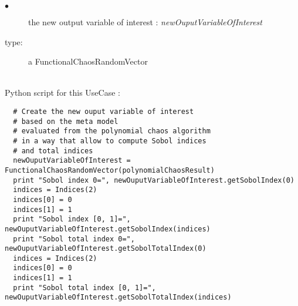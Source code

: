 {
  \begin{description}
  \item[$\bullet$] the new output variable of interest : {\itshape newOuputVariableOfInterest}
  \item[type:] a FunctionalChaosRandomVector
  \end{description}
}

\textspace\\
Python script for this UseCase :

\begin{lstlisting}
  # Create the new ouput variable of interest
  # based on the meta model
  # evaluated from the polynomial chaos algorithm
  # in a way that allow to compute Sobol indices
  # and total indices
  newOuputVariableOfInterest = FunctionalChaosRandomVector(polynomialChaosResult)
  print "Sobol index 0=", newOuputVariableOfInterest.getSobolIndex(0)
  indices = Indices(2)
  indices[0] = 0
  indices[1] = 1
  print "Sobol index [0, 1]=", newOuputVariableOfInterest.getSobolIndex(indices)
  print "Sobol total index 0=", newOuputVariableOfInterest.getSobolTotalIndex(0)
  indices = Indices(2)
  indices[0] = 0
  indices[1] = 1
  print "Sobol total index [0, 1]=", newOuputVariableOfInterest.getSobolTotalIndex(indices)

\end{lstlisting}
